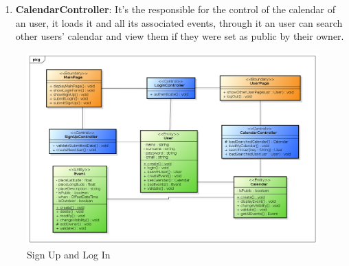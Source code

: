 \begin{itemize}
\begin{enumerate}
\item {\bf CalendarController}: It's the responsible for the control of the calendar of an user, it loads it and all its associated events, through it an user can search other users' calendar and view them if they were set as public by their owner.
\end{enumerate}
\begin{center}
 \begin{figure}[H]
    \includegraphics[width=1\textwidth]{./BCEDiagram/BCE/EntityOverview/LoginBCE.png}
    \caption{Sign Up and Log In}
     \label{fig:logBCE}
     \end{figure}
   \end{center}  
\end{itemize}

